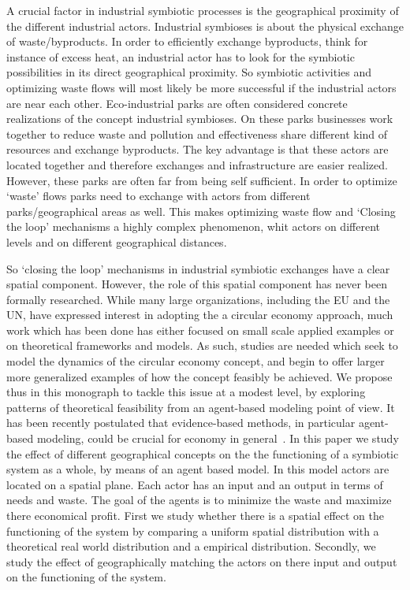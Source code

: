 \documentclass[fleqn,10pt]{wlscirep}
\begin{document}
A crucial factor in industrial symbiotic processes is the geographical proximity of the different industrial actors. Industrial symbioses is about the physical exchange of waste/byproducts. In order to efficiently exchange byproducts, think for instance of excess heat, an industrial actor has to look for the symbiotic possibilities in its direct geographical proximity. So symbiotic activities and optimizing waste flows will most likely be more successful if the industrial actors are near each other. Eco-industrial parks are often considered concrete realizations of the concept industrial symbioses. On these parks businesses work together to reduce waste and pollution and effectiveness share different kind of resources and exchange byproducts. The key advantage is that these actors are located together and therefore exchanges and infrastructure are easier realized. However, these parks are often far from being self sufficient. In order to optimize `waste' flows parks need to exchange with actors from different parks/geographical areas as well. This makes optimizing waste flow and `Closing the loop' mechanisms a highly complex phenomenon, whit actors on different levels and on different geographical distances. 

So `closing the loop' mechanisms in industrial symbiotic exchanges have a clear spatial component. However, the role of this spatial component has never been formally researched. While many large organizations, including the EU and the UN,  have expressed interest in adopting the a circular economy approach, much work which has been done has either focused on small scale applied examples or on theoretical frameworks and models. As such, studies are needed which seek to model the dynamics of the circular economy concept, and begin to offer larger more generalized examples of how the concept feasibly be achieved. We propose thus in this monograph to tackle this issue at a modest level, by exploring patterns of theoretical feasibility from an agent-based modeling point of view. It has been recently postulated that evidence-based methods, in particular agent-based modeling, could be crucial for economy in general~\cite{farmer2009economy}. In this paper we study the effect of different geographical concepts on the the functioning of a symbiotic system as a whole, by means of an agent based model. In this model actors are located on a spatial plane. Each actor has an input and an output in terms of needs and waste. The goal of the agents is to minimize the waste and maximize there economical profit. First we study whether there is a spatial effect on the functioning of the system by comparing a uniform spatial distribution with a theoretical real world distribution and a empirical distribution. Secondly, we study the effect of geographically matching the actors on there input and output on the functioning of the system. 
\end{document}
